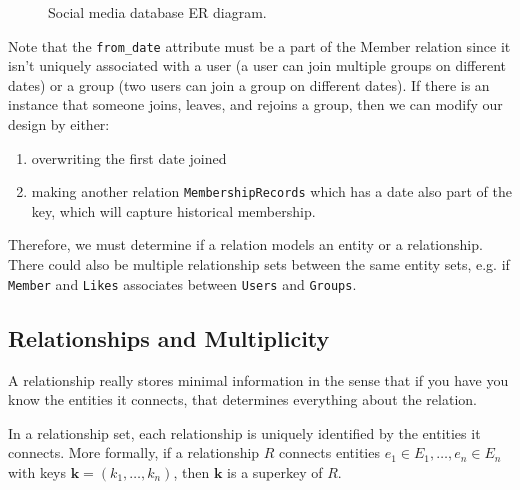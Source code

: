 \begin{example}[E/R Diagram]
\begin{figure}[H]
        \caption{Social media database ER diagram.} 
        \label{fig:social_media}
      \end{figure}

      Note that the \texttt{from\_date} attribute must be a part of the Member relation since it isn't uniquely associated with a user (a user can join multiple groups on different dates) or a group (two users can join a group on different dates). If there is an instance that someone joins, leaves, and rejoins a group, then we can modify our design by either: 
      \begin{enumerate}
        \item overwriting the first date joined 
        \item making another relation \texttt{MembershipRecords} which has a date also part of the key, which will capture historical membership.  
      \end{enumerate}
    \end{example}

    Therefore, we must determine if a relation models an entity or a relationship. There could also be multiple relationship sets between the same entity sets, e.g. if \texttt{Member} and \texttt{Likes} associates between \texttt{Users} and \texttt{Groups}. 

\subsection{Relationships and Multiplicity} 

    A relationship really stores minimal information in the sense that if you have you know the entities it connects, that determines everything about the relation. 

    \begin{theorem}
      \label{thm:relationships-are-functionally-dependent-on}
      In a relationship set, each relationship is uniquely identified by the entities it connects. More formally, if a relationship $R$ connects entities $e_1 \in E_1, \ldots, e_n \in E_n$ with keys $\mathbf{k} = (k_1, \ldots, k_n)$, then $\mathbf{k}$ is a superkey of $R$. 
    \end{theorem}

